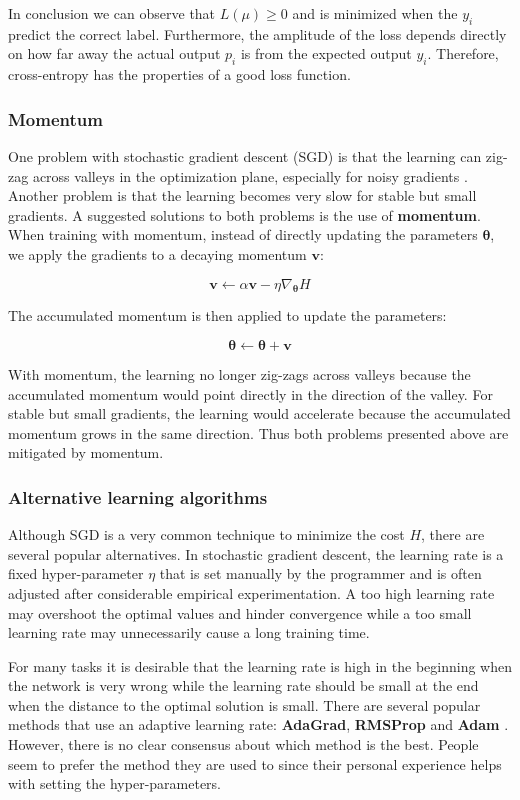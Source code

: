 In conclusion we can observe that $L(\mu) \geq 0$ and is minimized when the $y_i$ predict the correct label. Furthermore, the amplitude of the loss depends directly on how far away the actual output $p_i$ is from the expected output $y_i$. Therefore, cross-entropy has the properties of a good loss function.

\subsubsection{Momentum}

One problem with stochastic gradient descent (SGD) is that the learning can zig-zag across valleys in the optimization plane, especially for noisy gradients \cite[Chapter~8]{GoodfellowBook}. Another problem is that the learning becomes very slow for stable but small gradients. A suggested solutions to both problems is the use of \textbf{momentum}. When training with momentum, instead of directly updating the parameters $\mathbf{\theta}$, we apply the gradients to a decaying momentum $\mathbf{v}$:

\[
\mathbf{v} \leftarrow \alpha \mathbf{v} - \eta \nabla_{\mathbf{\theta}} H
\]

The accumulated momentum is then applied to update the parameters:

\[
\mathbf{\theta} \leftarrow \mathbf{\theta} + \mathbf{v}
\]

With momentum, the learning no longer zig-zags across valleys because the accumulated momentum would point directly in the direction of the valley. For stable but small gradients, the learning would accelerate because the accumulated momentum grows in the same direction. Thus both problems presented above are mitigated by momentum.

\subsubsection{Alternative learning algorithms}

Although SGD is a very common technique to minimize the cost $H$, there are several popular alternatives. In stochastic gradient descent, the learning rate is a fixed hyper-parameter $\eta$ that is set manually by the programmer and is often adjusted after considerable empirical experimentation. A too high learning rate may overshoot the optimal values and hinder convergence while a too small learning rate may unnecessarily cause a long training time.

For many tasks it is desirable that the learning rate is high in the beginning when the network is very wrong while the learning rate should be small at the end when the distance to the optimal solution is small. There are several popular methods that use an adaptive learning rate: \textbf{AdaGrad}, \textbf{RMSProp} and \textbf{Adam} \cite[Chapter~8]{GoodfellowBook}. However, there is no clear consensus about which method is the best. People seem to prefer the method they are used to since their personal experience helps with setting the hyper-parameters.

